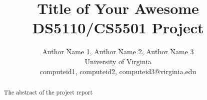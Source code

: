 \documentclass[letterpaper,twocolumn,10pt]{article}
\begin{document}

\date{}

\title{\Large \bf Title of Your Awesome DS5110/CS5501 Project}

\author{
	Author Name 1, Author Name 2, Author Name 3\\
	{University of Virginia}\\
	{computeid1, computeid2, computeid3}@virginia.edu
} 

\maketitle

\begin{abstract}
The abstract of the project report
\end{abstract}










\end{document}
